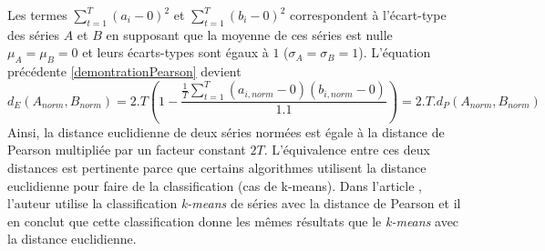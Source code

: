 Les termes $ \sum_{t=1}^{T}(a_i - 0)^{2}$ et $\sum_{t=1}^{T}(b_i - 0)^{2}$ correspondent \`a l'\'ecart-type des s\'eries $A$ et $B$ en supposant que la moyenne de ces s\'eries est nulle $\mu_{A} = \mu_{B} = 0$ et leurs \'ecarts-types sont \'egaux \`a $1$ ($\sigma_A = \sigma_B = 1$).
L'\'equation pr\'ec\'edente \ref{demontrationPearson} devient 
$$
d_E(A_{norm},B_{norm}) = 2.T (1 - \frac{\frac{1}{T} \sum_{t=1}^{T}(a_{i,norm} - 0)(b_{i,norm} - 0) }{1 . 1})
= 2 . T. d_P(A_{norm},B_{norm})
$$
Ainsi, la distance euclidienne de deux s\'eries norm\'ees est \'egale \`a la distance de Pearson multipli\'ee par un facteur constant $2T$.
L'\'equivalence entre ces deux distances est pertinente parce que certains algorithmes utilisent  la distance  euclidienne pour faire de la classification (cas de k-means). 
Dans l'article \cite{berthold2016clusteringDistancePearson}, l'auteur utilise la classification {\em k-means} de s\'eries avec la distance de Pearson et il en conclut que cette classification donne les m\^emes  r\'esultats que le {\em k-means} avec la distance euclidienne.